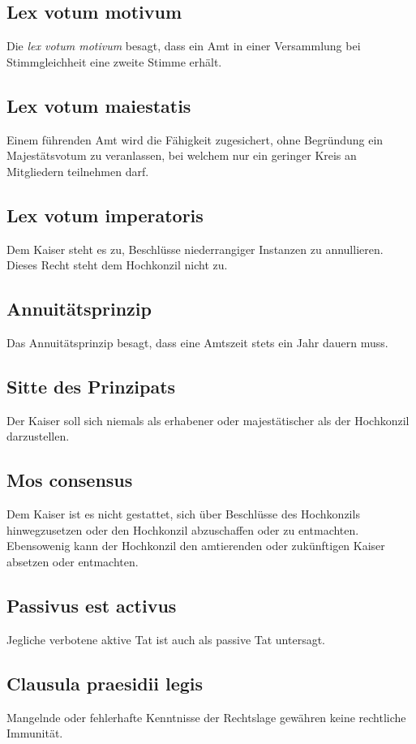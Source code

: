 \documentclass{article}
\begin{document}
\subsection{Lex votum motivum}
Die \textit{lex votum motivum} besagt, dass ein Amt in einer Versammlung bei Stimmgleichheit eine zweite Stimme erhält.

\subsection{Lex votum maiestatis}
Einem führenden Amt wird die Fähigkeit zugesichert, ohne Begründung ein Majestätsvotum zu veranlassen, bei welchem nur ein geringer Kreis an Mitgliedern teilnehmen darf.

\subsection{Lex votum imperatoris}
Dem Kaiser steht es zu, Beschlüsse niederrangiger Instanzen zu annullieren. Dieses Recht steht dem Hochkonzil nicht zu.

\subsection{Annuitätsprinzip}
Das Annuitätsprinzip besagt, dass eine Amtszeit stets ein Jahr dauern muss.

\subsection{Sitte des Prinzipats}
Der Kaiser soll sich niemals als erhabener oder majestätischer als der Hochkonzil darzustellen.

\subsection{Mos consensus}
Dem Kaiser ist es nicht gestattet, sich über Beschlüsse des Hochkonzils hinwegzusetzen oder den Hochkonzil abzuschaffen oder zu entmachten. Ebensowenig kann der Hochkonzil den amtierenden oder zukünftigen Kaiser absetzen oder entmachten.

\subsection{Passivus est activus}
Jegliche verbotene aktive Tat ist auch als passive Tat untersagt.

\subsection{Clausula praesidii legis}
Mangelnde oder fehlerhafte Kenntnisse der Rechtslage gewähren keine rechtliche Immunität.
\end{document}
